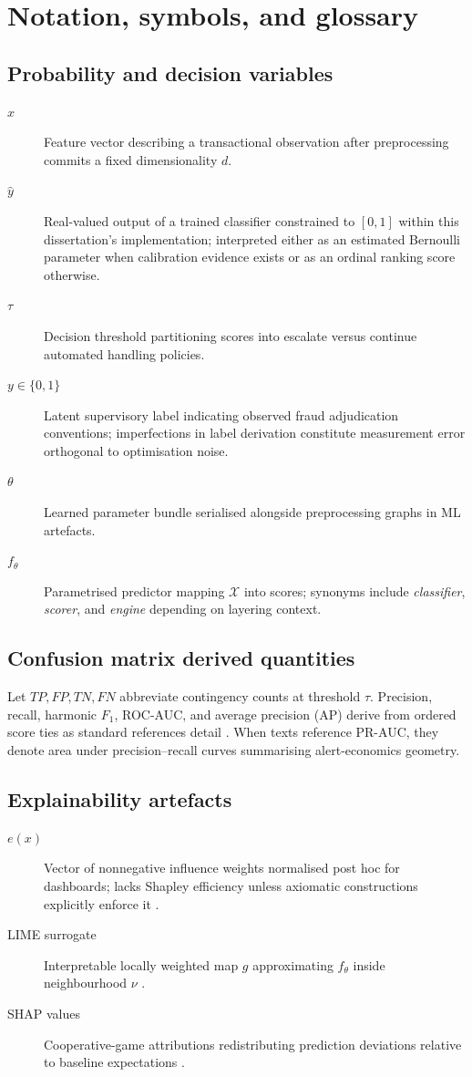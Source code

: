 \chapter{Notation, symbols, and glossary}

\section{Probability and decision variables}
\begin{description}
\item[$x$] Feature vector describing a transactional observation after preprocessing commits a fixed dimensionality $d$.
\item[$\hat{y}$] Real-valued output of a trained classifier constrained to $[0,1]$ within this dissertation's implementation; interpreted either as an estimated Bernoulli parameter when calibration evidence exists or as an ordinal ranking score otherwise.
\item[$\tau$] Decision threshold partitioning scores into escalate versus continue automated handling policies.
\item[$y\in\{0,1\}$] Latent supervisory label indicating observed fraud adjudication conventions; imperfections in label derivation constitute measurement error orthogonal to optimisation noise.
\item[$\theta$] Learned parameter bundle serialised alongside preprocessing graphs in ML artefacts.
\item[$f_\theta$] Parametrised predictor mapping $\mathcal{X}$ into scores; synonyms include \emph{classifier}, \emph{scorer}, and \emph{engine} depending on layering context.
\end{description}

\section{Confusion matrix derived quantities}
Let $TP,FP,TN,FN$ abbreviate contingency counts at threshold $\tau$. Precision, recall, harmonic $F_1$, ROC-AUC, and average precision (AP) derive from ordered score ties as standard references detail \cite{fraud_handbook}. When texts reference PR-AUC, they denote area under precision--recall curves summarising alert-economics geometry.

\section{Explainability artefacts}
\begin{description}
\item[$e(x)$] Vector of nonnegative influence weights normalised post hoc for dashboards; lacks Shapley efficiency unless axiomatic constructions explicitly enforce it \cite{xai_survey}.
\item[LIME surrogate] Interpretable locally weighted map $g$ approximating $f_\theta$ inside neighbourhood $\nu$ \cite{lime_original}.
\item[SHAP values] Cooperative-game attributions redistributing prediction deviations relative to baseline expectations \cite{shap_original}.
\end{description}

